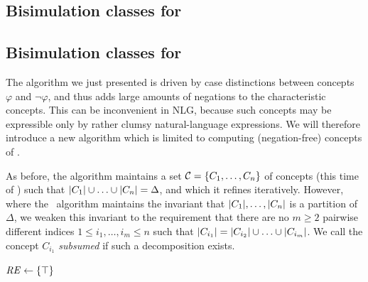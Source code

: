 \subsection{Bisimulation classes for \alc}


\subsection{Bisimulation classes for \el}

The algorithm we just presented is driven by case distinctions between
concepts $\varphi$ and $\neg \varphi$, and thus adds large amounts of
negations to the characteristic concepts.  This can be inconvenient
in NLG, because such concepts may be expressible only by rather clumsy
natural-language expressions.   We will therefore
introduce a new algorithm which is limited to computing
(negation-free) concepts of \el.  

As before, the algorithm maintains a set $\mathcal{C} = \{C_1,\ldots,C_n\}$ of
concepts (this time of \el) such that $|C_1| \cup \ldots \cup
|C_n| = \Delta$, and which it refines iteratively.  However,
where the \alc\ algorithm maintains the invariant that
$|C_1|,\ldots,|C_n|$ is a partition of $\Delta$, we
weaken this invariant to the requirement that there are no $m \geq 2$
pairwise different indices $1 \leq i_1,\ldots,i_m \leq n$ such that
$|C_{i_1}| = |C_{i_2}| \cup \ldots \cup
|C_{i_m}|$.  We call the concept $C_{i_1}$ \emph{subsumed} if
such a decomposition exists.





\begin{algorithm}[t]
\dontprintsemicolon
\caption{}
\label{algo:bisim-alc}

$\mathit{RE} \leftarrow \{\top\}$


 
\end{algorithm}

